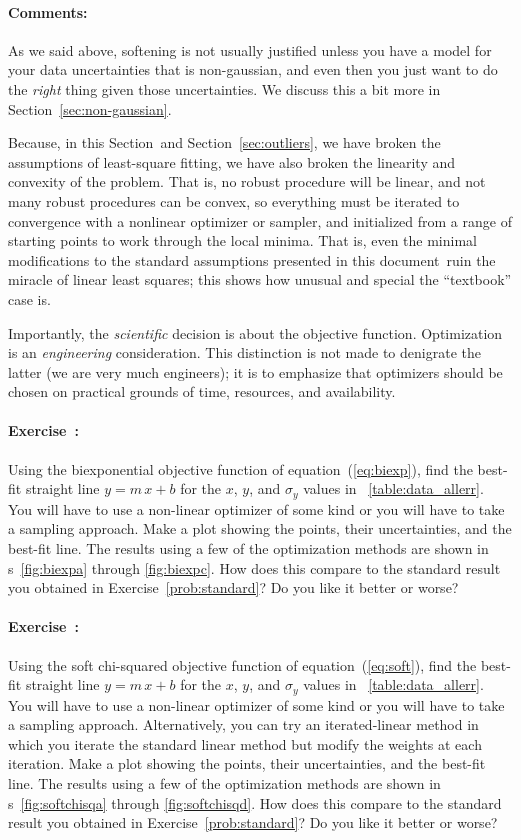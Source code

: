 \documentclass[12pt,twoside]{article}
\newcommand{\documentname}{document}
\newcommand{\sectionname}{Section}
\newcommand{\equationname}{equation}
\newcommand{\problemname}{Exercise}
\newcommand{\commentsname}{Comments}
\newcounter{problem}
\newenvironment{problem}{\paragraph{\problemname~\theproblem:}\refstepcounter{problem}}{}
\newenvironment{comments}{\paragraph{\commentsname:}}{}
\begin{document}
\begin{comments}
As we said above, softening is not usually justified unless you have a
model for your data uncertainties that is non-gaussian, and even then
you just want to do the \emph{right} thing given those uncertainties.
We discuss this a bit more in \sectionname~\ref{sec:non-gaussian}.

Because, in this \sectionname\ and \sectionname~\ref{sec:outliers}, we
have broken the assumptions of least-square fitting, we have also
broken the linearity and convexity of the problem.  That is, no robust
procedure will be linear, and not many robust procedures can be
convex, so everything must be iterated to convergence with a nonlinear
optimizer or sampler, and initialized from a range of starting points
to work through the local minima.  That is, even the minimal
modifications to the standard assumptions presented in this
\documentname\ ruin the miracle of linear least squares; this shows
how unusual and special the ``textbook'' case is.

Importantly, the \emph{scientific} decision is about the objective
function.  Optimization is an \emph{engineering} consideration.  This
distinction is not made to denigrate the latter (we are very much
engineers); it is to emphasize that optimizers should be chosen on
practical grounds of time, resources, and availability.
\end{comments}

\begin{problem}\label{prob:biexp}
Using the biexponential objective function of
\equationname~(\ref{eq:biexp}), find the best-fit straight line
$y=m\,x+b$ for the $x$, $y$, and $\sigma_y$ values in
\tablename~\ref{table:data_allerr}.  You will have to use a non-linear
optimizer of some kind or you will have to take a sampling approach.
Make a plot showing the points, their uncertainties, and the best-fit
line.  The results using a few of the optimization methods are shown
in \figurename s~\ref{fig:biexpa} through \ref{fig:biexpc}. How does
this compare to the standard result you obtained in
\problemname~\ref{prob:standard}?  Do you like it better or worse?
\end{problem}

\begin{problem}\label{prob:softchisq}
Using the soft chi-squared objective function of
\equationname~(\ref{eq:soft}), find the best-fit straight line
$y=m\,x+b$ for the $x$, $y$, and $\sigma_y$ values in
\tablename~\ref{table:data_allerr}.  You will have to use a non-linear
optimizer of some kind or you will have to take a sampling approach.
Alternatively, you can try an iterated-linear method in which you
iterate the standard linear method but modify the weights at each
iteration.  Make a plot showing the points, their uncertainties, and
the best-fit line.  The results using a few of the optimization
methods are shown in \figurename s~\ref{fig:softchisqa} through
\ref{fig:softchisqd}. How does this compare to the standard result you
obtained in \problemname~\ref{prob:standard}?  Do you like it better
or worse?
\end{problem}
\end{document}
